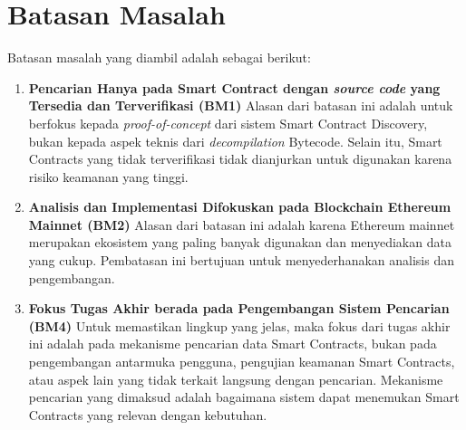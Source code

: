 \section{Batasan Masalah}
\label{sec:batasan-masalah}


Batasan masalah yang diambil adalah sebagai berikut:

\begin{enumerate}
	\item \textbf{Pencarian Hanya pada Smart Contract dengan \textit{\textit{source code}} yang Tersedia dan Terverifikasi (BM1)} \newline
	      Alasan dari batasan ini adalah untuk berfokus kepada \textit{proof-of-concept} dari sistem Smart Contract Discovery, bukan kepada aspek teknis dari \textit{decompilation} Bytecode. Selain itu, Smart Contracts yang tidak terverifikasi tidak dianjurkan untuk digunakan karena risiko keamanan yang tinggi.
	\item \textbf{Analisis dan Implementasi Difokuskan pada Blockchain Ethereum Mainnet (BM2)} \newline
	      Alasan dari batasan ini adalah karena Ethereum mainnet merupakan ekosistem yang paling banyak digunakan dan menyediakan data yang cukup. Pembatasan ini bertujuan untuk menyederhanakan analisis dan pengembangan.
	\item \textbf{Fokus Tugas Akhir berada pada Pengembangan Sistem Pencarian (BM4)} \newline
	      Untuk memastikan lingkup yang jelas, maka fokus dari tugas akhir ini adalah pada mekanisme pencarian data Smart Contracts, bukan pada pengembangan antarmuka pengguna, pengujian keamanan Smart Contracts, atau aspek lain yang tidak terkait langsung dengan pencarian. Mekanisme pencarian yang dimaksud adalah bagaimana sistem dapat menemukan Smart Contracts yang relevan dengan kebutuhan.
\end{enumerate}